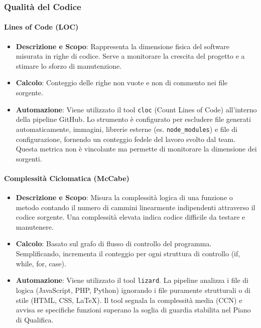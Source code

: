 \documentclass[11pt,a4paper]{article}
\begin{document}
\subsubsection{Qualità del Codice}
\paragraph{Lines of Code (LOC)}
\begin{itemize}
    \item \textbf{Descrizione e Scopo}: Rappresenta la dimensione fisica del software misurata in righe di codice. Serve a monitorare la crescita del progetto e a stimare lo sforzo di manutenzione.
    \item \textbf{Calcolo}: Conteggio delle righe non vuote e non di commento nei file sorgente.
    \item \textbf{Automazione}: Viene utilizzato il tool \texttt{cloc} (Count Lines of Code) all'interno della pipeline GitHub. Lo strumento è configurato per escludere file generati automaticamente, immagini, librerie esterne (es. \texttt{node\_modules}) e file di configurazione, fornendo un conteggio fedele del lavoro svolto dal team. Questa metrica non è vincolante ma permette di monitorare la dimensione dei sorgenti.
\end{itemize}

\paragraph{Complessità Ciclomatica (McCabe)}
\begin{itemize}
    \item \textbf{Descrizione e Scopo}: Misura la complessità logica di una funzione o metodo contando il numero di cammini linearmente indipendenti attraverso il codice sorgente. Una complessità elevata indica codice difficile da testare e manutenere.
    \item \textbf{Calcolo}: Basato sul grafo di flusso di controllo del programma. Semplificando, incrementa il conteggio per ogni struttura di controllo (if, while, for, case).
    \item \textbf{Automazione}: Viene utilizzato il tool \texttt{lizard}. La pipeline analizza i file di logica (JavaScript, PHP, Python) ignorando i file puramente strutturali o di stile (HTML, CSS, LaTeX). Il tool segnala la complessità media (CCN) e avvisa se specifiche funzioni superano la soglia di guardia stabilita nel Piano di Qualifica.
\end{itemize}
\end{document}
